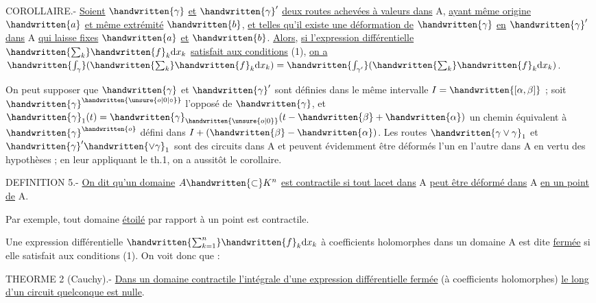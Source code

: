 COROLLAIRE.- \uline{Soient} $\handwritten{\gamma}$ \uline{et} $\handwritten{\gamma}'$ \uline{deux routes achevées à valeurs dans} A, \uline{ayant même origine} $\handwritten{a}$ \uline{et même extrémité} $\handwritten{b}$, \uline{et telles qu'il existe une déformation de} $\handwritten{\gamma}$ \uline{en} $\handwritten{\gamma}'$ \uline{dans} A \uline{qui laisse fixes} $\handwritten{a}$ \uline{et} $\handwritten{b}$. \uline{Alors}, \uline{si l'expression différentielle} $\handwritten{\sum_k}\handwritten{f}_k\mathrm{d}x_k$ \uline{satisfait aux conditions} (1), \uline{on a} $\handwritten{\int_\gamma}(\handwritten{\sum_k}\handwritten{f}_k\mathrm{d}x_k)=\handwritten{\int_{\gamma'}}(\handwritten{\sum_k}\handwritten{f}_k\mathrm{d}x_k)$.

On peut supposer que $\handwritten{\gamma}$ et $\handwritten{\gamma}'$ sont définies dans le même intervalle $I=\handwritten{[\alpha,\beta]}$ ; soit $\handwritten{\gamma}^{\handwritten{\unsure{o|0|\circ}}}$ l'opposé de $\handwritten{\gamma}$, et $\handwritten{\gamma}_1(t)=\handwritten{\gamma}_{\handwritten{\unsure{o|0}}}(t-\handwritten{\beta}+\handwritten{\alpha})$ un chemin équivalent à $\handwritten{\gamma}^{\handwritten{o}}$ défini dans $I+(\handwritten{\beta}-\handwritten{\alpha})$. Les routes $\handwritten{\gamma\vee\gamma}_1$ et $\handwritten{\gamma}'\handwritten{\vee\gamma}_1$ sont des circuits dans A et peuvent évidemment être déformés l'un en l'autre dans A en vertu des hypothèses ; en leur appliquant le th.1, on a aussitôt le corollaire.

D\handwritten{\rlap{\'{\phantom{E}}}}EFINITION 5.- \uline{On dit qu'un domaine} $A\handwritten{\subset}K^n$ \uline{est contractile si tout lacet dans} A \uline{peut être déformé dans} A \uline{en un point de} A.

Par exemple, tout domaine \uline{étoilé} par rapport à un point est contractile.

Une expression différentielle $\handwritten{\sum_{k=1}^n}\handwritten{f}_k\mathrm{d}x_k$ à coefficients holomorphes dans un domaine A est dite \uline{fermée} si elle satisfait aux conditions (1). On voit donc que :

TH\handwritten{\rlap{\'{\phantom{E}}}}EORME 2 (Cauchy).- \uline{Dans un domaine contractile l'intégrale d'une expression différentielle fermée} (à coefficients holomorphes) \uline{le long d'un circuit quelconque est nulle}.

